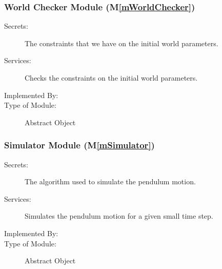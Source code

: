 \documentclass[12pt, titlepage]{article}
\newcommand{\mref}[1]{M\ref{#1}}
\begin{document}


\subsubsection{World Checker Module (\mref{mWorldChecker})}

\begin{description}
\item[Secrets:] The constraints that we have on the initial world parameters.
\item[Services:] Checks the constraints on the initial world parameters.
\item[Implemented By:] \progname{}
\item[Type of Module:] Abstract Object
\end{description}

\subsubsection{Simulator Module (\mref{mSimulator})}

\begin{description}
\item[Secrets:] The algorithm used to simulate the pendulum motion.
\item[Services:] Simulates the pendulum motion for a given small time step.
\item[Implemented By:] \progname{}
\item[Type of Module:] Abstract Object
\end{description}
\end{document}

